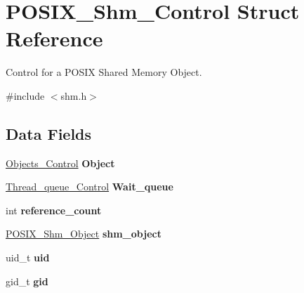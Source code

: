 \hypertarget{structPOSIX__Shm__Control}{}\section{P\+O\+S\+I\+X\+\_\+\+Shm\+\_\+\+Control Struct Reference}
\label{structPOSIX__Shm__Control}


Control for a P\+O\+S\+IX Shared Memory Object.  




{\ttfamily \#include $<$shm.\+h$>$}

\subsection*{Data Fields}
\begin{DoxyCompactItemize}
\item 
\mbox{\label{structPOSIX__Shm__Control_afcb635c18cee01024b55c7d658ee078c}} 
\mbox{\hyperlink{structObjects__Control}{Objects\+\_\+\+Control}} {\bfseries Object}
\item 
\mbox{\label{structPOSIX__Shm__Control_a3af97a55bf58b03c51284d4cf97843e0}} 
\mbox{\hyperlink{structThread__queue__Control}{Thread\+\_\+queue\+\_\+\+Control}} {\bfseries Wait\+\_\+queue}
\item 
\mbox{\label{structPOSIX__Shm__Control_a74427f09910a11047a175b8c98cecf19}} 
int {\bfseries reference\+\_\+count}
\item 
\mbox{\label{structPOSIX__Shm__Control_ad59944f878614d5a03927105b1ac6b53}} 
\mbox{\hyperlink{structPOSIX__Shm__Object}{P\+O\+S\+I\+X\+\_\+\+Shm\+\_\+\+Object}} {\bfseries shm\+\_\+object}
\item 
\mbox{\label{structPOSIX__Shm__Control_a357dd4382c75436f9ab25494d87ec161}} 
uid\+\_\+t {\bfseries uid}
\item 
\mbox{\label{structPOSIX__Shm__Control_a6499113f356bf28f2a07459215e9582a}} 
gid\+\_\+t {\bfseries gid}
\item 
\mbox{\label{structPOSIX__Shm__Control_a24328a9ae6f2923df0c398d4a0275d0a}} 

\end{DoxyCompactItemize}

